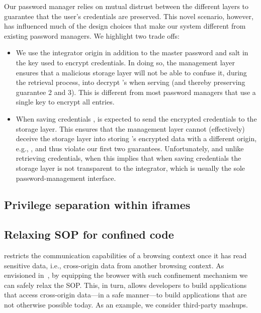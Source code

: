 Our password manager relies on mutual distrust between the different
layers to guarantee that the user's credentials are preserved.
%
This novel scenario, however, has influenced much of the design
choices that make our system different from existing password
managers.
%
We highlight two trade offs:
\begin{itemize}
\item
We use the integrator origin in addition to the master
password and salt in the key used to encrypt credentials.
%
In doing so, the management layer ensures that a malicious storage
layer will not be able to confuse it, during the retrieval process,
into decrypt 's when serving  (and
thereby preserving guarantee 2 and 3).
%
This is different from most password managers that use a single key
to encrypt all entries.
%
\item 
When saving credentials ,  is expected to send the
encrypted credentials to the storage layer.
%
This ensures that the management layer cannot (effectively) deceive
the storage layer into storing 's encrypted data with a
different origin, e.g., , and thus violate our first two
guarantees.
%
Unfortunately, and unlike retrieving credentials, when this implies
that when saving credentials the storage layer is not transparent to
the integrator, which is usually the sole password-management
interface.
%
\end{itemize}

\subsection{Privilege separation within iframes}
\label{sec:system:extension}


\subsection{Relaxing SOP for confined code}
\label{sec:system:mashup}
%
\sys{} restricts the communication capabilities of a
browsing context once it has read sensitive data, i.e., cross-origin
data from another browsing context.
%
As envisioned in~, by equipping the browser with such
confinement mechanism we can safely relax the SOP.
%
This, in turn, allows developers to build applications that access
cross-origin data---in a safe manner---to build applications that are
not otherwise possible today.
%
As an example, we consider third-party mashups.
